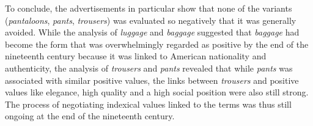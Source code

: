 To conclude, the advertisements in particular show that none of the variants (\emph{pantaloons}, \emph{pants}, \emph{trousers}) was evaluated so negatively that it was generally avoided. While the analysis of \emph{luggage} and \emph{baggage} suggested that \emph{baggage} had become the form that was overwhelmingly regarded as positive by the end of the nineteenth century because it was linked to American nationality and authenticity, the analysis of \emph{trousers} and \emph{pants} revealed that while \emph{pants} was associated with similar positive values, the links between \emph{trousers} and positive values like elegance, high quality and a high social position were also still strong. The process of negotiating indexical values linked to the terms was thus still ongoing at the end of the nineteenth century.


